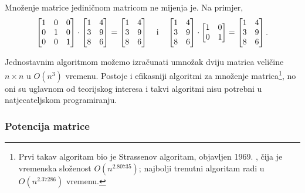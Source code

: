 \begin{samepage}
Množenje matrice jediničnom matricom
ne mijenja je. Na primjer,
\[
 \begin{bmatrix}
  1 & 0 & 0 \\
  0 & 1 & 0 \\
  0 & 0 & 1 \\
 \end{bmatrix}
\cdot
 \begin{bmatrix}
  1 & 4 \\
  3 & 9 \\
  8 & 6 \\
 \end{bmatrix}
=
 \begin{bmatrix}
  1 & 4 \\
  3 & 9 \\
  8 & 6 \\
 \end{bmatrix} \hspace{10px} \textrm{i} \hspace{10px}
 \begin{bmatrix}
  1 & 4 \\
  3 & 9 \\
  8 & 6 \\
 \end{bmatrix}
\cdot
 \begin{bmatrix}
  1 & 0 \\
  0 & 1 \\
 \end{bmatrix}
=
 \begin{bmatrix}
  1 & 4 \\
  3 & 9 \\
  8 & 6 \\
 \end{bmatrix}.
\]
\end{samepage}

Jednostavnim algoritmom
možemo izračunati umnožak
dviju matrica veličine $n \times n$
u $O(n^3)$ vremenu.
Postoje i efikasniji algoritmi
za množenje matrica\footnote{Prvi takav
algoritam bio je Strassenov algoritam,
objavljen 1969. \cite{str69},
čija je vremenska složenost $O(n^{2.80735})$;
najbolji trenutni algoritam \cite{gal14}
radi u $O(n^{2.37286})$ vremenu.},
no oni su uglavnom od teorijskog interesa
i takvi algoritmi nisu potrebni
u natjecateljskom programiranju.


\subsubsection{Potencija matrice}

